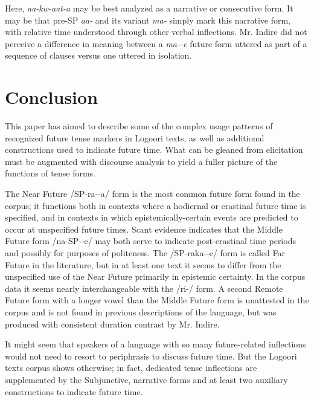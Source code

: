 \documentclass[output=paper]{langsci/langscibook}
\begin{document}
Here, \textit{aa-kw-aat-a} may be best analyzed as a narrative %
%
or consecutive form. It may be that pre-SP \textit{aa-} and its variant \textit{ma-} simply mark this narrative form, with relative time understood through other verbal inflections. Mr. Indire did not perceive a difference in meaning between a \textit{ma-{\longrule}-e} future form uttered as part of a sequence of clauses versus one uttered in isolation.

\section[Conclusion]{Conclusion} \label{sec:sarvasy:8}

This paper has aimed to describe some of the complex usage patterns of recognized future tense markers in Logoori texts, as well as additional constructions used to indicate future time. What can be gleaned from elicitation must be augmented with discourse analysis to yield a fuller picture of the functions of tense forms. 

The Near Future /SP-ra-{\longrule}-a/ form is the most common future form found in the corpus; it functions both in contexts where a hodiernal or crastinal future time is specified, and in contexts in which epistemically-certain events are predicted to occur at unspecified future times. Scant evidence indicates that the Middle Future form /na-SP-{\longrule}-e/ may both serve to indicate post-crastinal time periods and possibly for purposes of politeness. The /SP-raka-{\longrule}-e/ form is called Far Future in the literature, but in at least one text it seems to differ from the unspecified use of the Near Future primarily in epistemic certainty. In the corpus data it seems nearly interchangeable with the /ri-/ form. A second Remote Future form with a longer vowel than the Middle Future form is unattested in the corpus and is not found in previous descriptions of the language, but was produced with consistent duration contrast by Mr. Indire. 

It might seem that speakers of a language with so many future-related inflections would not need to resort to periphrasis to discuss future time. But the Logoori texts corpus shows otherwise; in fact, dedicated tense inflections are supplemented by the Subjunctive, narrative forms and at least two auxiliary constructions to indicate future time.
\end{document}
